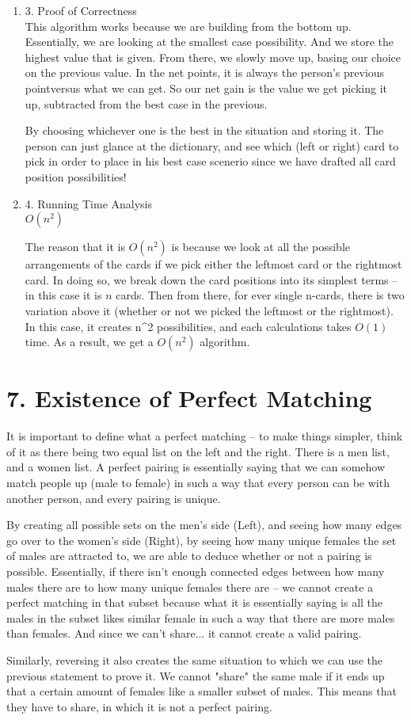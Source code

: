 \documentclass[11pt]{article}
\newenvironment{qparts}{\begin{enumerate}[{(}a{)}]}{\end{enumerate}}
\begin{document}
\begin{qparts}
\begin{qparts}
\begin{verbatim}
    if CR > CL:
      cVal(C.cardPosition()) = pair(C[last].val() - CR, last_card)
    else:
      cVal(C.cardPosition()) = pair(C[1].val() - CL, first_card)
\end{verbatim}
\item[3.] Proof of Correctness \\
This algorithm works because we are building from the bottom up. Essentially, we are looking at the smallest case possibility. And we store the highest value that is given. From there, we slowly move up, basing our choice on the previous value. In the net points, it is always the person's previous pointversus what we can get. So our net gain is the value we get picking it up, subtracted from the best case in the previous. 

By choosing whichever one is the best in the situation and storing it. The person can just glance at the dictionary, and see which (left or right) card to pick in order to place in his best case scenerio since we have drafted all card position possibilities! 
\item[4.] Running Time Analysis \\
$O(n^2)$

The reason that it is $O(n^2)$ is because we look at all the possible arrangements of the cards if we pick either the leftmost card or the rightmost card. In doing so, we break down the card positions into its simplest terms -- in this case it is $n$ cards. Then from there, for ever single n-cards, there is two variation above it (whether or not we picked the leftmost or the rightmost). In this case, it creates n^2 possibilities, and each calculations takes $O(1)$ time. As a result, we get a $O(n^2)$ algorithm. 
	\end{qparts}
\end{qparts}
\newpage
\section*{7. Existence of Perfect Matching}
It is important to define what a perfect matching -- to make things simpler, think of it as there being two equal list on the left and the right. There is a men list, and a women list. A perfect pairing is essentially saying that we can somehow match people up (male to female) in such a way that every person can be with another person, and every pairing is unique. 

By creating all possible sets on the men's side (Left), and seeing how many edges go over to the women's side (Right), by seeing how many unique females the set of males are attracted to, we are able to deduce whether or not a pairing is possible. Essentially, if there isn't enough connected edges between how many males there are to how many unique females there are -- we cannot create a perfect matching in that subset because what it is essentially saying is all the males in the subset likes similar female in such a way that there are more males than females. And since we can't share... it cannot create a valid pairing. 

Similarly, reversing it also creates the same situation to which we can use the previous statement to prove it. We cannot "share" the same male if it ends up that a certain amount of females like a smaller subset of males. This means that they have to share, in which it is not a perfect pairing. 
\end{document}
